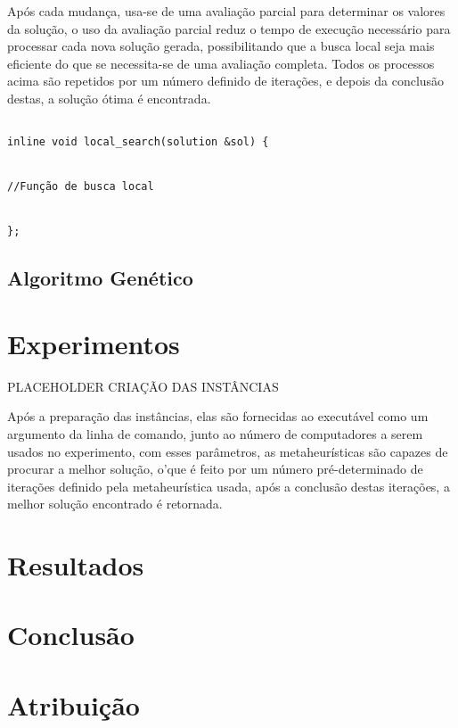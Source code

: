 \documentclass[12pt]{article}
\begin{document}
Após cada mudança, usa-se de uma avaliação parcial para determinar os valores da solução, o uso da avaliação parcial reduz o tempo de execução necessário para processar cada nova solução gerada, possibilitando que a busca local seja mais eficiente do que se necessita-se de uma avaliação completa. Todos os processos acima são repetidos por um número definido de iterações, e depois da conclusão destas, a solução ótima é encontrada.



\begin{lstlisting}

inline void local_search(solution &sol) {


//Função de busca local
 

};

\end{lstlisting}
\begingroup
{}
\endgroup




\subsection{Algoritmo Genético}











\section{Experimentos}

PLACEHOLDER CRIAÇÃO DAS INSTÂNCIAS 

Após a preparação das instâncias, elas são fornecidas ao executável como um argumento da linha de comando, junto ao número de computadores a serem usados no experimento, com esses parâmetros, as metaheurísticas são capazes de procurar a melhor solução, o'que é feito por um número pré-determinado de iterações definido pela metaheurística usada, após a conclusão destas iterações,  a melhor solução encontrado é retornada.



\section{Resultados}


\section{Conclusão}


\section{Atribuição}
\end{document}
